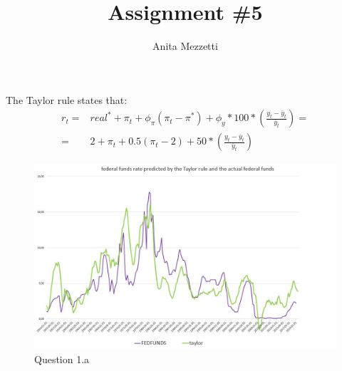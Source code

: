 \documentclass[	11pt, ]{fphw}
\title{Assignment \#5} %
\author{Anita Mezzetti}
\institute{École polytechnique fédérale de Lausanne}
\begin{document}
\maketitle 
\section{}
\subsection{}

The Taylor rule states that:
\begin{align}
    r_{t} = & real^{*}+ \pi _{t} + \phi_{\pi} (\pi _{t}- \pi^{*}) + \phi_{y} * 100 * (\frac{y_{t}-\overline{y}_{t}}{\overline{y}_{t}}) = \\
    = & 2 + \pi _{t} + 0.5 ( \pi _{t}- 2) + 50 *  (\frac{y_{t}-\overline{y}_{t}}{\overline{y}_{t}})
\end{align}
\begin{figure}[h] 
\centering 
\includegraphics[scale=0.7]{es5a.JPG} 
\caption{Question 1.a} 
\label{11}
\end{figure}
\end{document}
